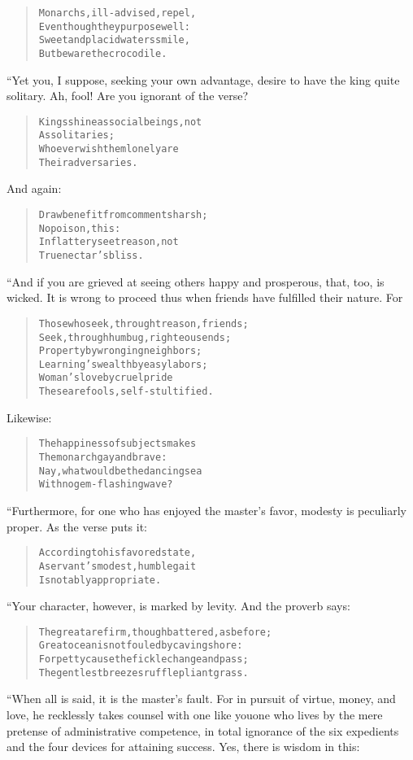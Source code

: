 \documentclass[article, twoside, 14pt]{memoir}
\renewenvironment{verbatim}{%
\begin{quote}%
\vskip -10pt%
\begin{alltt}\normalfont\large}{\end{alltt}%
\end{quote}%
\vskip -10pt
} %
\begin{document}
\begin{verbatim}
Monarchs, ill-advised, repel,
Even though they purpose well:
Sweet and placid waters smile,
But beware the crocodile.
\end{verbatim}
“Yet you, I suppose, seeking your own advantage, desire to have the
king quite solitary. Ah, fool! Are you ignorant of the verse?

\begin{verbatim}
Kings shine as social beings, not
    As solitaries;
Whoever wish them lonely are
    Their adversaries.
\end{verbatim}
And again:

\begin{verbatim}
Draw benefit from comments harsh;
    No poison, this:
In flattery see treason, not
    True nectar's bliss.
\end{verbatim}
“And if you are grieved at seeing others happy and prosperous,
that, too, is wicked. It is wrong to proceed thus when friends have
fulfilled their nature. For

\begin{verbatim}
Those who seek, through treason, friends;
Seek, through humbug, righteous ends;
Property by wronging neighbors;
Learning's wealth by easy labors;
Woman's love by cruel pride{\textemdash}
These are fools, self-stultified.
\end{verbatim}
Likewise:

\begin{verbatim}
The happiness of subjects makes
    The monarch gay and brave:
Nay, what would be the dancing sea
    With no gem-flashing wave?
\end{verbatim}
“Furthermore, for one who has enjoyed the master's favor, modesty
is peculiarly proper. As the verse puts it:

\begin{verbatim}
According to his favored state,
A servant's modest, humble gait
Is notably appropriate.
\end{verbatim}
“Your character, however, is marked by levity. And the proverb
says:

\begin{verbatim}
The great are firm, though battered, as before;
Great ocean is not fouled by caving shore:
For petty cause the fickle change and pass;
The gentlest breezes ruffle pliant grass.
\end{verbatim}
“When all is said, it is the master's fault. For in pursuit of
virtue, money, and love, he recklessly takes counsel with one like
you{\textemdash}one who lives by the mere pretense of administrative
competence, in total ignorance of the six expedients and the four
devices for attaining success. Yes, there is wisdom in this:
\end{document}
